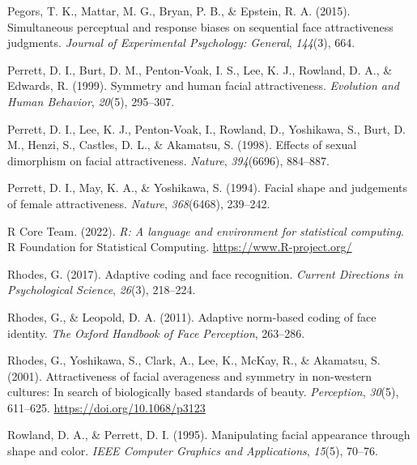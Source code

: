 \documentclass[
  doc,floatsintext]{apa6}
\newlength{\cslhangindent}
\newlength{\cslentryspacingunit} %
\newenvironment{CSLReferences}[2] %
 {%
  \setlength{\parindent}{0pt}
  \ifodd #1
  \let\oldpar\par
  \def\par{\hangindent=\cslhangindent\oldpar}
  \fi
  \setlength{\parskip}{#2\cslentryspacingunit}
 }%
 {}
\begin{document}
\begin{CSLReferences}{1}{0}
\leavevmode{}%
Pegors, T. K., Mattar, M. G., Bryan, P. B., \& Epstein, R. A. (2015). Simultaneous perceptual and response biases on sequential face attractiveness judgments. \emph{Journal of Experimental Psychology: General}, \emph{144}(3), 664.

\leavevmode{}%
Perrett, D. I., Burt, D. M., Penton-Voak, I. S., Lee, K. J., Rowland, D. A., \& Edwards, R. (1999). Symmetry and human facial attractiveness. \emph{Evolution and Human Behavior}, \emph{20}(5), 295--307.

\leavevmode{}%
Perrett, D. I., Lee, K. J., Penton-Voak, I., Rowland, D., Yoshikawa, S., Burt, D. M., Henzi, S., Castles, D. L., \& Akamatsu, S. (1998). Effects of sexual dimorphism on facial attractiveness. \emph{Nature}, \emph{394}(6696), 884--887.

\leavevmode{}%
Perrett, D. I., May, K. A., \& Yoshikawa, S. (1994). Facial shape and judgements of female attractiveness. \emph{Nature}, \emph{368}(6468), 239--242.

\leavevmode{}%
R Core Team. (2022). \emph{R: A language and environment for statistical computing}. R Foundation for Statistical Computing. \url{https://www.R-project.org/}

\leavevmode{}%
Rhodes, G. (2017). Adaptive coding and face recognition. \emph{Current Directions in Psychological Science}, \emph{26}(3), 218--224.

\leavevmode{}%
Rhodes, G., \& Leopold, D. A. (2011). Adaptive norm-based coding of face identity. \emph{The Oxford Handbook of Face Perception}, 263--286.

\leavevmode{}%
Rhodes, G., Yoshikawa, S., Clark, A., Lee, K., McKay, R., \& Akamatsu, S. (2001). Attractiveness of facial averageness and symmetry in non-western cultures: In search of biologically based standards of beauty. \emph{Perception}, \emph{30}(5), 611--625. \url{https://doi.org/10.1068/p3123}

\leavevmode{}%
Rowland, D. A., \& Perrett, D. I. (1995). Manipulating facial appearance through shape and color. \emph{IEEE Computer Graphics and Applications}, \emph{15}(5), 70--76.


\end{CSLReferences}
\end{document}
